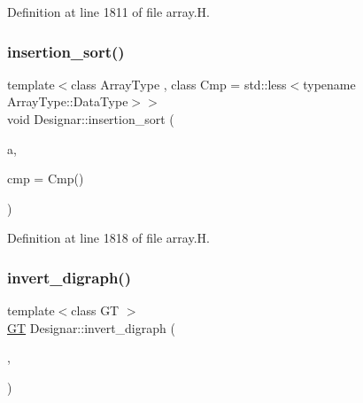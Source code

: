 Definition at line 1811 of file array.\+H.

\mbox{\label{namespace_designar_a93966614af4a5a6c0bd78fe75af5e7cf}} 
\subsubsection{\texorpdfstring{insertion\+\_\+sort()}{insertion\_sort()}\hspace{0.1cm}{\footnotesize\ttfamily [6/6]}}
{\footnotesize\ttfamily template$<$class Array\+Type , class Cmp  = std\+::less$<$typename Array\+Type\+::\+Data\+Type$>$$>$ \\
void Designar\+::insertion\+\_\+sort (\begin{DoxyParamCaption}\item[{Array\+Type \&}]{a,  }\item[{Cmp \&\&}]{cmp = {\ttfamily Cmp()} }\end{DoxyParamCaption})\hspace{0.3cm}{\ttfamily [inline]}}



Definition at line 1818 of file array.\+H.

\mbox{\label{namespace_designar_a35a0d2875876e94cc6f9036f85491091}} 
\subsubsection{\texorpdfstring{invert\+\_\+digraph()}{invert\_digraph()}\hspace{0.1cm}{\footnotesize\ttfamily [1/2]}}
{\footnotesize\ttfamily template$<$class GT $>$ \\
\hyperlink{demo-buildgraph_8_c_a3001c40d2c31ca87ed96cd7d1334a55e}{GT} Designar\+::invert\+\_\+digraph (\begin{DoxyParamCaption}\item[{\hyperlink{demo-buildgraph_8_c_a3001c40d2c31ca87ed96cd7d1334a55e}{GT} \&}]{,  }\item[{bool}]{ }\end{DoxyParamCaption})}

\mbox{\label{namespace_designar_a3f14dc1be082db37ea18784d48c92a54}} 
